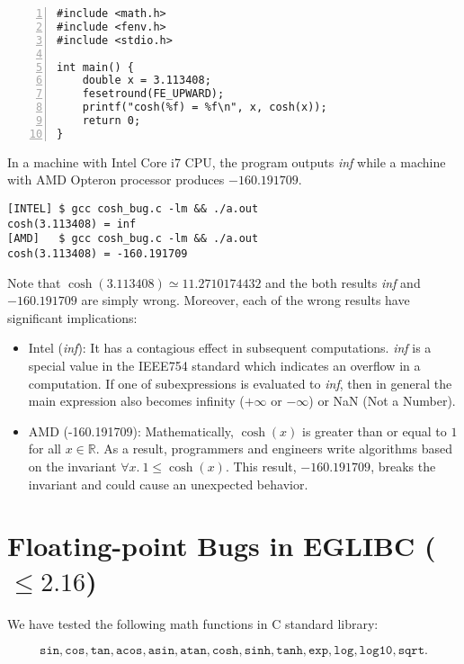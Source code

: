 \documentclass[12pt]{article}
\begin{document}
\begin{Verbatim}[numbers=left, frame=single, fontsize=\relsize{-1}]
#include <math.h>
#include <fenv.h>
#include <stdio.h>

int main() {
    double x = 3.113408;
    fesetround(FE_UPWARD);
    printf("cosh(%f) = %f\n", x, cosh(x));
    return 0;
}
\end{Verbatim}

In a machine with Intel Core i7 CPU, the program outputs
\textit{inf} while a machine with AMD Opteron processor produces
$-160.191709$.

\begin{Verbatim}[frame=single, fontsize=\relsize{-1}]
[INTEL] $ gcc cosh_bug.c -lm && ./a.out
cosh(3.113408) = inf
[AMD]   $ gcc cosh_bug.c -lm && ./a.out
cosh(3.113408) = -160.191709
\end{Verbatim}

Note that $\cosh(3.113408) \simeq 11.2710174432$ and the both results
\textit{inf} and $-160.191709$ are simply wrong. Moreover, each of the
wrong results have significant implications:

\begin{itemize}
\item Intel (\textit{inf}): It has a contagious effect in subsequent
  computations. \textit{inf} is a special value in the IEEE754
  standard which indicates an overflow in a computation. If one of
  subexpressions is evaluated to \textit{inf}, then in general the
  main expression also becomes infinity ($+\infty$ or $-\infty$) or
  NaN (Not a Number).
\item AMD (-160.191709): Mathematically, $\cosh(x)$ is greater than or
  equal to $1$ for all $x \in \mathbb{R}$. As a result, programmers
  and engineers write algorithms based on the invariant $\forall x. \
  1 \le \cosh(x)$. This result, $-160.191709$, breaks the invariant
  and could cause an unexpected behavior.
\end{itemize}


\section{Floating-point Bugs in EGLIBC ($\le 2.16$)}\label{sec:bugs}

We have tested the following math functions in C standard library:

\[
\mathtt{sin}, \mathtt{cos}, \mathtt{tan}, \mathtt{acos},
\mathtt{asin}, \mathtt{atan}, \mathtt{cosh}, \mathtt{sinh},
\mathtt{tanh}, \mathtt{exp}, \mathtt{log}, \mathtt{log10},
\mathtt{sqrt}.
\]
\end{document}
